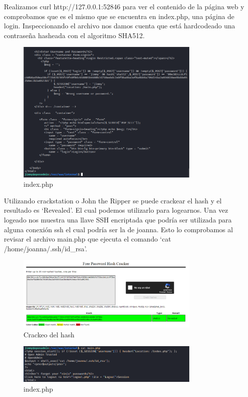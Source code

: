 \documentclass{article}
\begin{document}
Realizamos curl http://127.0.0.1:52846 para ver el contenido de la página web y comprobamos que es el mismo que se encuentra en index.php, una página de login. Inspeccionando el archivo nos damos cuenta que está hardcodeado una contraseña hasheada con el algoritmo SHA512. 
\begin{figure}[h]
	\center
	\includegraphics[width=0.8\textwidth]{images/openadmin/12-indexphp.png}
	\caption{index.php}
\end{figure}

Utilizando crackstation o John the Ripper se puede crackear el hash y el resultado es `Revealed'. El cual podemos utilizarlo para logearnos. Una vez logeado nos muestra una llave SSH encriptada que podría ser utilizada para alguna conexión ssh el cual podría ser la de joanna. Esto lo comprobamos al revisar el archivo main.php que ejecuta el comando `cat /home/joanna/.ssh/id\_rsa'.
\begin{figure}[h]
	\center
	\includegraphics[width=0.8\textwidth]{images/openadmin/13-crackstation.png}
	\caption{Crackeo del hash}
\end{figure}

\begin{figure}[h]
	\center
	\includegraphics[width=0.8\textwidth]{images/openadmin/14-mainphp.png}
	\caption{index.php}
\end{figure}
\end{document}
